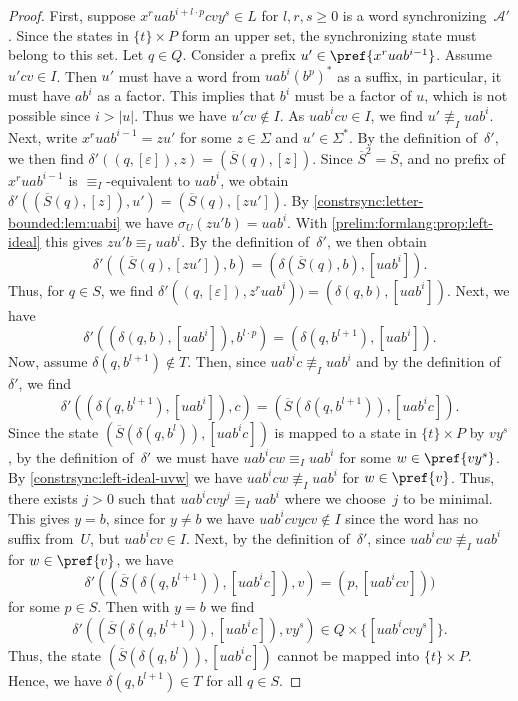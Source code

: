 \begin{proof}
	First, suppose $x^r u a b^{i + l\cdot p} c v y^s \in L$ for $l,r, s \ge 0$
	is a word synchronizing~$\mathcal A'$.
	Since the states in $\{t\} \times P$ form an upper set,
	the synchronizing state must belong to this set.
	Let $q \in Q$.
	Consider a prefix $u' \in \pref{x^r ua b^{i-1}}$.
	Assume $u'cv \in I$.
	Then $u'$ must have a word from $uab^i(b^p)^*$ as a suffix,
	in particular, it must have $ab^i$ as a factor.
	This implies that $b^i$ must be a factor of $u$,
	which is not possible since $i > |u|$.
	Thus we have $u'cv \notin I$.
	As $uab^icv \in I$, we find $u' \not\equiv_I uab^i$.
	Next, write $x^r ua b^{i-1} = z u'$ for some $z \in \Sigma$ and $u' \in \Sigma^*$.
	By the definition of~$\delta'$,
	we then find $\delta'((q, [\varepsilon]), z) = (\overline{S}(q), [z])$.
	Since $\overline{S}^2 = \overline{S}$,
	and no prefix of $x^ruab^{i-1}$ is $\equiv_I$-equivalent to $uab^i$,
	we obtain $\delta'((\overline{S}(q), [z]), u') = (\overline{S}(q), [zu'])$.
	By \cref{constrsync:letter-bounded:lem:uabi} 
	we have $\sigma_U(zu'b) = uab^i$.
	With \cref{prelim:formlang:prop:left-ideal} this gives
	$zu'b \equiv_I uab^i$.
	By the definition of~$\delta'$, we then obtain
	\[
	\delta'((\overline{S}(q), [zu']), b)
	= (\delta(\overline{S}(q), b), [uab^i]).
	\]
	Thus, for $q \in S$,
	we find $\delta'((q, [\varepsilon]), z^r u a b^i)) = (\delta(q,b), [uab^i])$.
	Next, we have 
	\[
	\delta'((\delta(q,b), [uab^i]), b^{l\cdot p}) = (\delta(q, b^{l+1}), [uab^i]).
	\]
	Now, assume $\delta(q, b^{l+1}) \notin T$.
	Then, since $uab^ic \not\equiv_I uab^i$ and by the definition of $\delta'$,
	we find	
	\[ 
	\delta'((\delta(q, b^{l+1}), [uab^i]), c) = (\overline{S}(\delta(q, b^{l+1})), [uab^ic]).
	\]
	Since the state $(\overline{S}(\delta(q, b^l)), [uab^ic])$
	is mapped to a state in $\{t\} \times P$ by $vy^s$, by the definition of~$\delta'$
	we must have $uab^ic w \equiv_I uab^i$ for some $w \in \pref{vy^s}$.
	By \cref{constrsync:left-ideal-uvw}
	we have $uab^icw \not\equiv_I uab^i$ for $w \in \pref{v}$.
	Thus, there exists $j > 0$ such that $uab^icvy^j \equiv_I uab^i$ where we 
	choose~$j$ to be minimal.
	This gives $y = b$, since for $y \ne b$
	we have $uab^icvycv\notin I$ since the word has no suffix from~$U$, 
	but $uab^icv\in I$.	
	Next, by the definition of~$\delta'$,
	since $uab^ic w \not\equiv_I uab^i$ for $w \in \pref{v}$, we have
	\[
	\delta'((\overline{S}(\delta(q, b^{l+1})), [uab^ic]), v) = (p, [uab^icv]))
	\]
	for some $p \in S$.
	Then with $y = b$ we find
	\[
	\delta'((\overline{S}(\delta(q, b^{l+1})), [uab^ic]), vy^s) \in Q \times \{ [uab^icvy^s] \}.
	\]
	Thus, the state $(\overline{S}(\delta(q, b^l)), [uab^ic])$
	cannot be mapped into $\{t\} \times P$.
	Hence, we have $\delta(q, b^{l+1}) \in T$
	for all $q \in S$.	
	

\end{proof}
